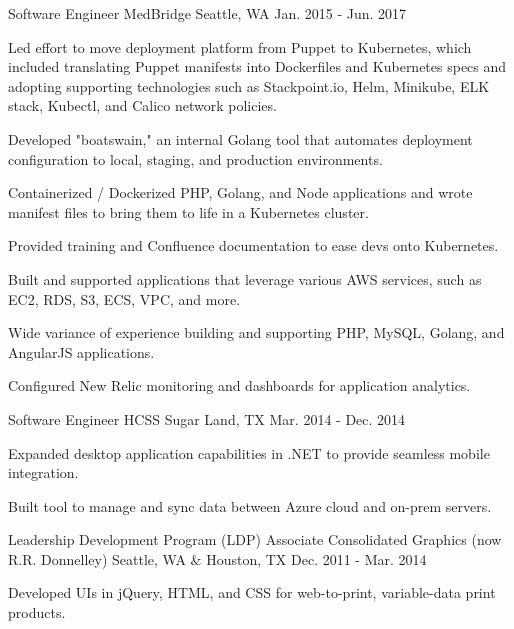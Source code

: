 \begin{cventries}

\cventry
{Software Engineer} %
{MedBridge} %
{Seattle, WA} %
{Jan. 2015 - Jun. 2017} %
{ %
\begin{cvitems}
\item {Led effort to move deployment platform from Puppet to Kubernetes, which included translating Puppet manifests into Dockerfiles and Kubernetes specs and  adopting supporting technologies such as Stackpoint.io, Helm, Minikube, ELK stack, Kubectl, and Calico network policies.}
\item {Developed "boatswain," an internal Golang tool that automates deployment configuration to local, staging, and production environments.}
\item {Containerized / Dockerized PHP, Golang, and Node applications and wrote manifest files to bring them to life in a Kubernetes cluster.}
\item {Provided training and Confluence documentation to ease devs onto Kubernetes.}
\item {Built and supported applications that leverage various AWS services, such as EC2, RDS, S3, ECS, VPC, and more.}
\item {Wide variance of experience building and supporting PHP, MySQL, Golang, and AngularJS applications.}
\item {Configured New Relic monitoring and dashboards for application analytics.}
\end{cvitems} 
}


\cventry
{Software Engineer} %
{HCSS} %
{Sugar Land, TX} %
{Mar. 2014 - Dec. 2014} %
{ %
\begin{cvitems}
\item {Expanded desktop application capabilities in .NET to provide seamless mobile integration.}
\item {Built tool to manage and sync data between Azure cloud and on-prem servers.}
\end{cvitems}
}


\cventry
{Leadership Development Program (LDP) Associate} %
{Consolidated Graphics (now R.R. Donnelley)} %
{Seattle, WA \& Houston, TX} %
{Dec. 2011 - Mar. 2014} %
{ %
\begin{cvitems}
\item {Developed UIs in jQuery, HTML, and CSS for web-to-print, variable-data print products.}
\end{cvitems}
}

\end{cventries}
